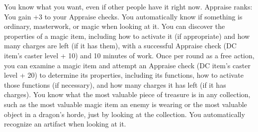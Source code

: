 \skillfeat
{You know what you want, even if other people have it right now.}
{Appraise ranks:}
{You gain +3 to your Appraise checks.}
{You automatically know if something is ordinary, masterwork, or magic when looking at it.}
{You can discover the properties of a magic item, including how to activate it (if appropriate) and how many charges are left (if it has them), with a successful Appraise check (DC item's caster level + 10) and 10 minutes of work.}
{Once per round as a free action, you can examine a magic item and attempt an Appraise check (DC item's caster level + 20) to determine its properties, including its functions, how to activate those functions (if necessary), and how many charges it has left (if it has charges).}
{You know what the most valuable piece of treasure is in any collection, such as the most valuable magic item an enemy is wearing or the most valuable object in a dragon's horde, just by looking at the collection. You automatically recognize an artifact when looking at it.}